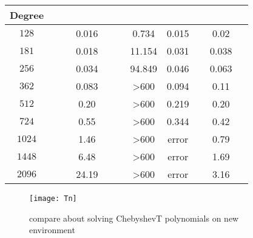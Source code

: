 \begin{table}[H]
	\centering
	\label{tab:and}
	\begin{tabular}{|| c| c| c| c| c ||}
		\hline
		
		\hline
		\scriptsize{Degree}  &\ \  \ \ \ \ \scriptsize{\froot}\ \  \ \  \ \   & \scriptsize{\REALROOT} &\scriptsize{\inte}  &\ \   \ \    \scriptsize{\AND}\ \ \ \   \\
		\hline
		$128$ & 0.016 & 0.734 &  0.015 &  0.02\\
		\hline
		$181$ & 0.018 & 11.154 & 0.031 & 0.038\\
		\hline
		$256$ & 0.034 & 94.849&  0.046  & 0.063\\
		\hline
		$362$ & 0.083 & >600&  0.094 & 0.11\\
		\hline
		$512$ & 0.20 &  >600 & 0.219 & 0.20  \\
		
		\hline
		$724$ & 0.55 &  >600&  0.344 & 0.42 \\
		
		\hline
		$1024$ & 1.46 & >600& {\color{red}error} & 0.79 \\
		
		\hline
		$1448$ & 6.48 &  >600&  {\color{red}error} &  1.69 \\
		\hline
		$2096$ & 24.19 &  >600&  {\color{red}error} & 3.16 \\	
		\hline
		
		\hline
	\end{tabular}%
\end{table}


\begin{figure}[!ht]
	\begin{centering}
		\texttt{[image: Tn]}
		\caption{ compare about solving ChebyshevT polynomials on new environment\label{fig:r}}
	\end{centering}
\end{figure}


%
%


